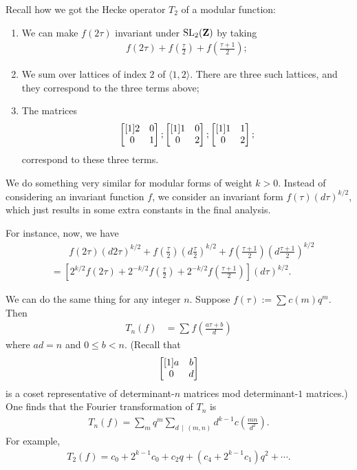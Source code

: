 \documentclass[11pt, oneside,margin=1in]{article}
\begin{document}
Recall how we got the Hecke operator $T_2$ of a modular function:
\begin{enumerate}
	\item We can make $f(2\tau)$ invariant under $\operatorname{SL}_{2}(\mathbf{Z})$ by taking
		\begin{align*}
			f(2\tau) + f \left( \frac{\tau}{2} \right) + f \left( \frac{\tau+1}{2} \right) ;
		\end{align*}
	\item We sum over lattices of index $2$ of $\langle 1,2\rangle $. There are three such lattices, and they correspond to the three terms above;
	\item The matrices 
		\begin{align*}
			\begin{bmatrix} [1] 2&0\\0&1\end{bmatrix}; \begin{bmatrix} [1] 1&0\\0&2\end{bmatrix} ;\begin{bmatrix} [1] 1&1\\0&2\end{bmatrix};
		\end{align*}
		correspond to these three terms.
\end{enumerate}
We do something very similar for modular forms of weight $k>0$. Instead of considering an invariant function $f$, we consider an invariant form $f(\tau)  (d\tau)^{ k/2}$, which just results in some extra constants in the final analysis. 

For instance, now, we have
\begin{align*}
&\phantom{=}\,\ \,	f(2\tau)  (d 2\tau)^{k/2} + f\left( \frac{\tau}{2} \right) \left( d \frac{\tau}{2} \right) ^{k/2} + f\left( \frac{\tau+1}{2} \right) \left( d \frac{\tau+1}{2} \right) ^{k/2}\\ &= \left[2^{k/2}f(2\tau) + 2^{-k/2}f \left( \frac{\tau}{2} \right) + 2^{-k/2}f \left( \frac{\tau+1}{2} \right) \right](d\tau)^{k/2}.
\end{align*}

We can do the same thing for any integer $n$. Suppose $f(\tau) :=  \sum^{} c(m)q^m$. Then
\begin{align*}
	T_n(f) &=  \sum_{}^{} f\left( \frac{a\tau+b}{d} \right)  
\end{align*}
where $ad = n$ and $0\le b< n$. (Recall that 
\begin{align*}
	\begin{bmatrix} [1] a&b\\0&d\end{bmatrix}
\end{align*}
is a coset representative of determinant-$n$ matrices mod determinant-$1$ matrices.) One finds that the Fourier transformation of $T_n$ is
\begin{align*}
	T_n(f) =  \sum_{m}^{} q^m \sum_{d\,\mid\,(m,n)}^{}  d^{k-1} c \left( \frac{mn}{d^2} \right). 
\end{align*}
For example,
\begin{align*}
	T_2(f) =  c_0 + 2^{k-1} c_0 +c_2q + (c_4 + 2^{k-1}c_1)q^2 + \cdots. 
\end{align*}
\end{document}
